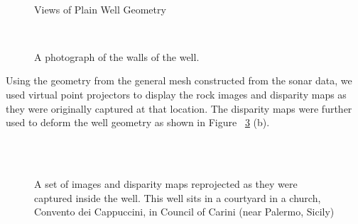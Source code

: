\documentclass[twocolumn]{article}
\begin{document}
\begin{figure}[!h]
	\centering
		\quad %
		\\%

		\caption{Views of Plain Well Geometry}
		\label{fig:wellNoFine}
\end{figure}

\begin{figure}[!h]
	\centering
		\\%

		\caption{ A photograph of the walls of the well.}
		\label{fig:wellPhoto}
\end{figure}

Using the geometry from the general mesh constructed from the sonar data, we used virtual point projectors to display the rock images and disparity maps as they were originally captured at that location.  
The disparity maps were further used to deform the well geometry as shown in Figure ~\ref{fig:result2} (b).

\begin{figure}[!h]
	\centering
		\\
		\quad %
			\\		
	
		\caption{A set of images and disparity maps reprojected as they were captured inside the well. This well sits in a courtyard in a church, Convento dei Cappuccini, in Council of Carini (near Palermo, Sicily)}
		\label{fig:result2}
\end{figure}

%
\end{document}

